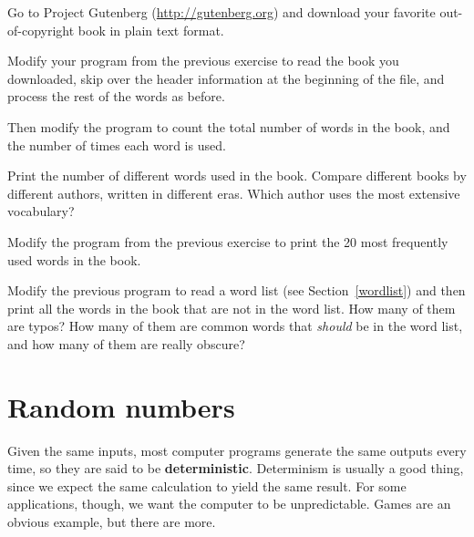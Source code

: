 \documentclass[10pt]{book}
\begin{document}
\begin{exercise}

Go to Project Gutenberg (\url{http://gutenberg.org}) and download
your favorite out-of-copyright book in plain text format.

Modify your program from the previous exercise to read the book
you downloaded, skip over the header information at the beginning
of the file, and process the rest of the words as before.

Then modify the program to count the total number of words in
the book, and the number of times each word is used.

Print the number of different words used in the book.  Compare
different books by different authors, written in different eras.
Which author uses the most extensive vocabulary?
\end{exercise}


\begin{exercise}

Modify the program from the previous exercise to print the
20 most frequently used words in the book.

\end{exercise}


\begin{exercise}

Modify the previous program to read a word list (see
Section~\ref{wordlist}) and then print all the words in the book that
are not in the word list.  How many of them are typos?  How many of
them are common words that {\em should} be in the word list, and how
many of them are really obscure?

\end{exercise}


\section{Random numbers}

Given the same inputs, most computer programs generate the same
outputs every time, so they are said to be {\bf deterministic}.
Determinism is usually a good thing, since we expect the same
calculation to yield the same result.  For some applications, though,
we want the computer to be unpredictable.  Games are an obvious
example, but there are more.
\end{document}
